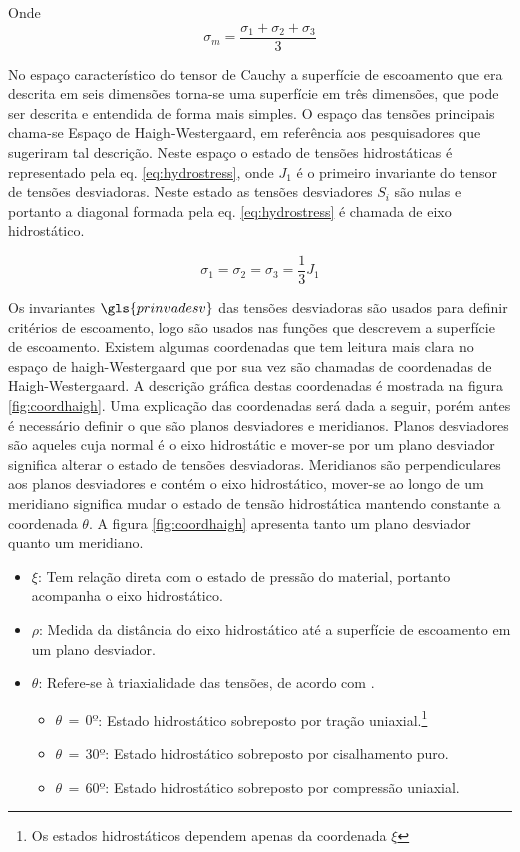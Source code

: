 Onde 
\begin{equation}
     \sigma_m = \frac{\sigma_1 + \sigma_2 + \sigma_3}{3}
\end{equation}

No espaço característico do tensor de Cauchy a superfície de escoamento que era descrita em seis dimensões torna-se uma superfície em três dimensões, que pode ser descrita e entendida de forma mais simples. O espaço das tensões principais chama-se Espaço de Haigh-Westergaard, em referência aos pesquisadores que sugeriram tal descrição. Neste espaço o estado de tensões hidrostáticas é representado pela eq. \ref{eq:hydrostress}, onde $ J_1 $ é o primeiro invariante do tensor de tensões desviadoras. Neste estado as tensões desviadores $S_i$ são nulas e portanto a diagonal formada pela eq. \ref{eq:hydrostress} é chamada de eixo hidrostático.  

\begin{equation} \label{eq:hydrostress}
    \sigma_1 = \sigma_2 = \sigma_3 = \frac{1}{3} J_1
\end{equation}

Os invariantes $\gls{prinvadesv}$ das tensões desviadoras são usados para definir critérios de escoamento, logo são usados nas funções que descrevem a superfície de escoamento. Existem algumas coordenadas que tem leitura mais clara no espaço de haigh-Westergaard que por sua vez são chamadas de coordenadas de Haigh-Westergaard. A descrição gráfica destas coordenadas é mostrada na figura \ref{fig:coordhaigh}. Uma explicação das coordenadas será dada a seguir, porém antes é necessário definir o que são planos desviadores e meridianos. Planos desviadores são aqueles cuja normal é o eixo hidrostátic e mover-se por um plano desviador significa alterar o estado de tensões desviadoras. Meridianos são perpendiculares aos planos desviadores e contém o eixo hidrostático, mover-se ao longo de um meridiano significa mudar o estado de tensão hidrostática mantendo constante a coordenada $\theta$. A figura \ref{fig:coordhaigh} apresenta tanto um plano desviador quanto um meridiano. \\

\begin{itemize}
    \item $ \xi $: Tem relação direta com o estado de pressão do material, portanto acompanha o eixo hidrostático.
    \item $ \rho $: Medida da distância do eixo hidrostático até a superfície de escoamento em um plano desviador.
    \item $ \theta $: Refere-se à triaxialidade das tensões, de acordo com \cite{hiermaier_2008}.
    \begin{itemize}
        \item $\theta \, = \, 0 º$: Estado hidrostático sobreposto por tração uniaxial.\footnote{Os estados hidrostáticos dependem apenas da coordenada $\xi$}
        \item $\theta \, = \, 30 º$: Estado hidrostático sobreposto por cisalhamento puro.
        \item $\theta \, = \, 60 º$: Estado hidrostático sobreposto por compressão uniaxial. 
    \end{itemize}
\end{itemize}


